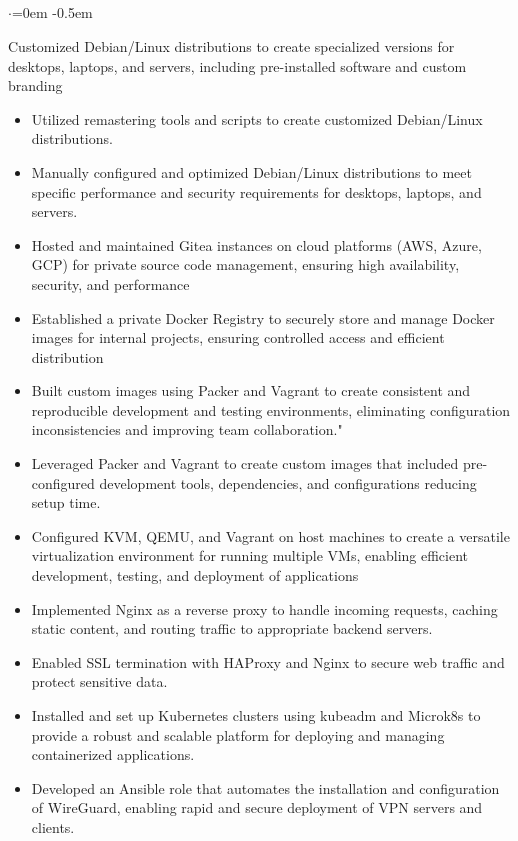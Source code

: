 \documentclass{article}
\begin{document}
\subsection*{}
\vspace{-2.6em}
\begin{list}{$\cdot$}{\leftmargin=0em} %
    \itemsep -0.5em \vspace{-0.5em} %
    \item Customized Debian/Linux distributions to create specialized versions for desktops, laptops, and servers, including pre-installed software  and custom branding
\end{list}
\vspace{-1.6em}
\begin{itemize}
    \item Utilized remastering tools and scripts to create customized Debian/Linux distributions.
    \item Manually configured and optimized Debian/Linux distributions to meet specific performance and security requirements for desktops, laptops, and servers.
    \item Hosted and maintained Gitea instances on cloud platforms (AWS, Azure, GCP) for private source code management, ensuring high availability, security, and performance
    \item Established a private Docker Registry to securely store and manage Docker images for internal projects, ensuring controlled access and efficient distribution
    \item Built custom images using Packer and Vagrant to create consistent and reproducible development and testing environments, eliminating configuration inconsistencies and improving team collaboration."
    \item Leveraged Packer and Vagrant to create custom images that included pre-configured development tools, dependencies, and configurations  reducing setup time. 
    \item Configured KVM, QEMU, and Vagrant on host machines to create a versatile virtualization environment for running multiple VMs, enabling efficient development, testing, and deployment of applications
    \item Implemented Nginx as a reverse proxy to handle incoming requests, caching static content, and routing traffic to appropriate backend servers.
    \item Enabled SSL termination with HAProxy and Nginx to secure web traffic and protect sensitive data.
    \item Installed and set up Kubernetes clusters using kubeadm and Microk8s to provide a robust and scalable platform for deploying and managing containerized applications.
    \item Developed an Ansible role that automates the installation and configuration of WireGuard, enabling rapid and secure deployment of VPN servers and clients.
\end{itemize}
\end{document}
